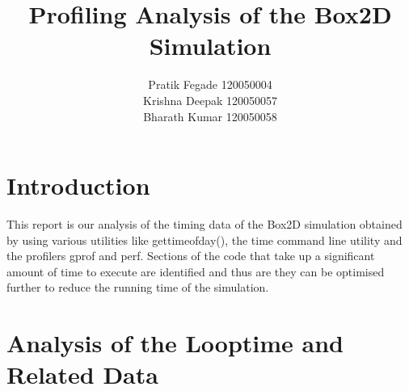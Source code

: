 \documentclass[11pt]{article}
\begin{document}
\title{Profiling Analysis of the Box2D Simulation}

\author{Pratik Fegade 120050004\\
Krishna Deepak 120050057\\
Bharath Kumar 120050058\\}
\maketitle

\section{Introduction}
This report is our analysis of the timing data of the Box2D simulation obtained by using various utilities like gettimeofday(), the time command line utility and the profilers gprof and perf. Sections of the code that take up a significant amount of time to execute are identified and thus are they can be optimised further to reduce the running time of the simulation.

\section{Analysis of the Looptime and Related Data}
\end{document}
